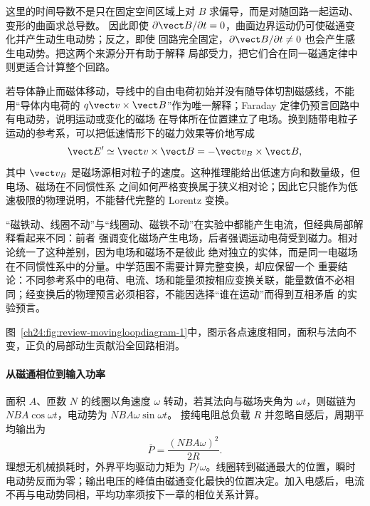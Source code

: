 这里的时间导数不是只在固定空间区域上对 $B$ 求偏导，而是对随回路一起运动、变形的曲面求总导数。
因此即使 $\partial\vect B/\partial t=0$，曲面边界运动仍可使磁通变化并产生动生电动势；反之，即使
回路完全固定，$\partial\vect B/\partial t\ne0$ 也会产生感生电动势。把这两个来源分开有助于解释
局部受力，把它们合在同一磁通定律中则更适合计算整个回路。

若导体静止而磁体移动，导线中的自由电荷初始并没有随导体切割磁感线，不能用“导体内电荷的
$q\vect v\times\vect B$”作为唯一解释；Faraday 定律仍预言回路中有电动势，说明运动或变化的磁场
在导体所在位置建立了电场。换到随带电粒子运动的参考系，可以把低速情形下的磁力效果等价地写成
\begin{equation}
  \vect E'\simeq\vect v\times\vect B=-\vect v_B\times\vect B,
\end{equation}
其中 $\vect v_B$ 是磁场源相对粒子的速度。这种推理能给出低速方向和数量级，但电场、磁场在不同惯性系
之间如何严格变换属于狭义相对论；因此它只能作为低速极限的物理说明，不能替代完整的 Lorentz 变换。

“磁铁动、线圈不动”与“线圈动、磁铁不动”在实验中都能产生电流，但经典局部解释看起来不同：前者
强调变化磁场产生电场，后者强调运动电荷受到磁力。相对论统一了这种差别，因为电场和磁场不是彼此
绝对独立的实体，而是同一电磁场在不同惯性系中的分量。中学范围不需要计算完整变换，却应保留一个
重要结论：不同参考系中的电荷、电流、场和能量须按相应变换关联，能量数值不必相同；经变换后的物理预言必须相容，不能因选择“谁在运动”而得到互相矛盾
的实验预言。

图~\ref{ch24:fig:review-movingloopdiagram-1}中，图示各点速度相同，面积与法向不变，正负的局部动生贡献沿全回路相消。
\par\noindent\begin{minipage}{\linewidth}
\movingLoopDiagram
{}\label{ch24:fig:review-movingloopdiagram-1}
\end{minipage}\par\medskip


\paragraph{从磁通相位到输入功率}
面积 $A$、匝数 $N$ 的线圈以角速度 $\omega$ 转动，若其法向与磁场夹角为 $\omega t$，则磁链为 $NBA\cos\omega t$，电动势为 $NBA\omega\sin\omega t$。
接纯电阻总负载 $R$ 并忽略自感后，周期平均输出为
\[
 \overline P=\frac{(NBA\omega)^2}{2R}.
\]
理想无机械损耗时，外界平均驱动力矩为 $\overline P/\omega$。线圈转到磁通最大的位置，瞬时电动势反而为零；输出电压的峰值由磁通变化最快的位置决定。加入电感后，电流不再与电动势同相，平均功率须按下一章的相位关系计算。

